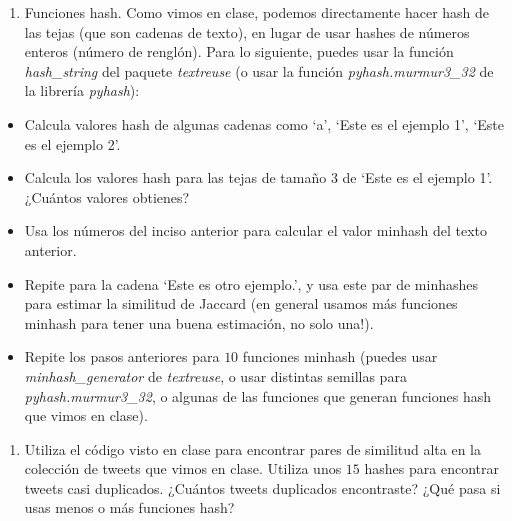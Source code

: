 \documentclass[]{article}
\providecommand{\tightlist}{%
  \setlength{\itemsep}{0pt}\setlength{\parskip}{0pt}}
\begin{document}
\begin{enumerate}
\def\labelenumi{\arabic{enumi}.}
\setcounter{enumi}{2}
\tightlist
\item
  Funciones hash. Como vimos en clase, podemos directamente hacer hash
  de las tejas (que son cadenas de texto), en lugar de usar hashes de
  números enteros (número de renglón). Para lo siguiente, puedes usar la
  función \emph{hash\_string} del paquete \emph{textreuse} (o usar la
  función \emph{pyhash.murmur3\_32} de la librería \emph{pyhash}):
\end{enumerate}

\begin{itemize}
\tightlist
\item
  Calcula valores hash de algunas cadenas como `a', `Este es el ejemplo
  1', `Este es el ejemplo 2'.
\item
  Calcula los valores hash para las tejas de tamaño \(3\) de `Este es el
  ejemplo 1'. ¿Cuántos valores obtienes?
\item
  Usa los números del inciso anterior para calcular el valor minhash del
  texto anterior.
\item
  Repite para la cadena `Este es otro ejemplo.', y usa este par de
  minhashes para estimar la similitud de Jaccard (en general usamos más
  funciones minhash para tener una buena estimación, no solo una!).
\item
  Repite los pasos anteriores para \(10\) funciones minhash (puedes usar
  \emph{minhash\_generator} de \emph{textreuse}, o usar distintas
  semillas para \emph{pyhash.murmur3\_32}, o algunas de las funciones
  que generan funciones hash que vimos en clase).
\end{itemize}

\begin{enumerate}
\def\labelenumi{\arabic{enumi}.}
\setcounter{enumi}{3}
\tightlist
\item
  Utiliza el código visto en clase para encontrar pares de similitud
  alta en la colección de tweets que vimos en clase. Utiliza unos \(15\)
  hashes para encontrar tweets casi duplicados. ¿Cuántos tweets
  duplicados encontraste? ¿Qué pasa si usas menos o más funciones hash?
\end{enumerate}
\end{document}

